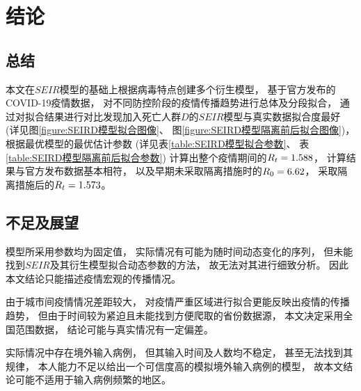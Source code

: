 \section{结论}
\subsection{总结}
\par 本文在$SEIR$模型的基础上根据病毒特点创建多个衍生模型，
基于官方发布的COVID-19疫情数据，
对不同防控阶段的疫情传播趋势进行总体及分段拟合，
通过对拟合结果进行对比发现加入死亡人群$D$的$SEIR$模型与真实数据拟合度最好
(详见图\ref{figure:SEIRD模型拟合图像}、
图\ref{figure:SEIRD模型隔离前后拟合图像})，
根据最优模型的最优估计参数
(详见表\ref{table:SEIRD模型拟合参数}、
表\ref{table:SEIRD模型隔离前后拟合参数})
计算出整个疫情期间的$R_t=1.588$，
计算结果与官方发布数据基本相符，
以及早期未采取隔离措施时的$R_0=6.62$，
采取隔离措施后的$R_t=1.573$。
\subsection{不足及展望}
\par 模型所采用参数均为固定值，
实际情况有可能为随时间动态变化的序列，
但未能找到$SEIR$及其衍生模型拟合动态参数的方法，
故无法对其进行细致分析。
因此本文结论只能描述疫情宏观的传播情况。
\par 由于城市间疫情情况差距较大，
对疫情严重区域进行拟合更能反映出疫情的传播趋势，
但由于时间较为紧迫且未能找到方便爬取的省份数据源，
本文决定采用全国范围数据，
结论可能与真实情况有一定偏差。
\par 实际情况中存在境外输入病例，
但其输入时间及人数均不稳定，
甚至无法找到其规律，
本人能力不足以给出一个可信度高的模拟境外输入病例的模型，
故本文结论可能不适用于输入病例频繁的地区。